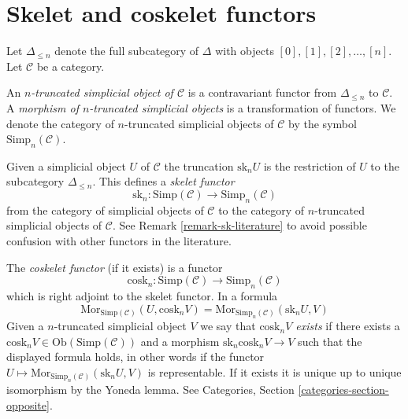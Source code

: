 \section{Skelet and coskelet functors}
\label{section-skelet}

\noindent
Let $\Delta_{\leq n}$ denote the full subcategory of
$\Delta$ with objects $[0], [1], [2], \ldots, [n]$.
Let $\mathcal{C}$ be a category.

\begin{definition}
\label{definition-truncated-simplicial-object}
An {\it $n$-truncated simplicial object of $\mathcal{C}$}
is a contravariant functor from $\Delta_{\leq n}$ to
$\mathcal{C}$. A {\it morphism of $n$-truncated
simplicial objects} is a transformation of functors.
We denote the category of $n$-truncated
simplicial objects of $\mathcal{C}$ by
the symbol $\text{Simp}_n(\mathcal{C})$.
\end{definition}

\noindent
Given a simplicial object $U$ of $\mathcal{C}$
the truncation $\text{sk}_n U$ is the restriction
of $U$ to the subcategory $\Delta_{\leq n}$.
This defines a {\it skelet functor}
$$
\text{sk}_n :
\text{Simp}(\mathcal{C}) \longrightarrow \text{Simp}_n(\mathcal{C})
$$
from the category of simplicial objects of $\mathcal{C}$
to the category of $n$-truncated simplicial objects of $\mathcal{C}$.
See Remark \ref{remark-sk-literature} to avoid possible confusion
with other functors in the literature.

\medskip\noindent
The {\it coskelet functor} (if it exists) is a functor
$$
\text{cosk}_n :
\text{Simp}(\mathcal{C}) \longrightarrow \text{Simp}_n(\mathcal{C})
$$
which is right adjoint to the skelet functor. In a formula
\begin{equation}
\label{equation-cosk}
\text{Mor}_{\text{Simp}(\mathcal{C})}(U, \text{cosk}_n V)
=
\text{Mor}_{\text{Simp}_n(\mathcal{C})}(\text{sk}_n U, V)
\end{equation}
Given a $n$-truncated simplicial object $V$ we
say that {\it $\text{cosk}_nV$ exists} if there
exists a $\text{cosk}_nV \in \text{Ob}(\text{Simp}(\mathcal{C}))$
and a morphism $\text{sk}_n \text{cosk}_n V \to V$
such that the displayed formula holds, in other words
if the functor
$U \mapsto \text{Mor}_{\text{Simp}_n(\mathcal{C})}(\text{sk}_n U, V)$
is representable. If it exists it
is unique up to unique isomorphism by the Yoneda lemma.
See Categories, Section \ref{categories-section-opposite}.

